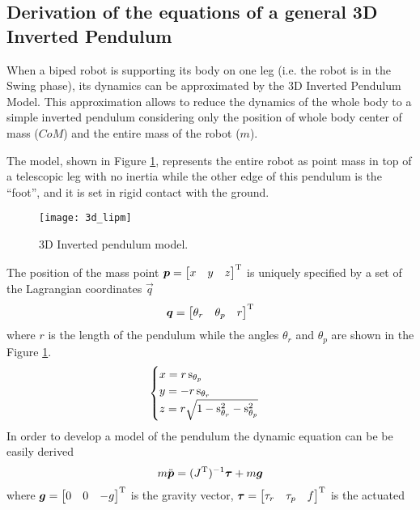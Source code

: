 \subsection{Derivation of the equations of a general 3D Inverted Pendulum}
When a biped robot is supporting its body on one leg (i.e. the robot is
in the Swing phase), its dynamics can be approximated by the 3D Inverted Pendulum Model. This
approximation allows to reduce the dynamics of the whole body to a simple inverted pendulum
considering only the position of whole body center of mass ($CoM$) and
the entire mass of the robot ($m$).
\par
The model, shown in Figure \ref{fig:3d_lipm}, represents the entire robot as point mass in
top of a telescopic leg with no inertia while the other edge of this pendulum is the
``foot'', and it is set in rigid contact with the ground.
\begin{figure}[!ht]
  \centering
  \texttt{[image: 3d\_lipm]}
  \caption{3D Inverted pendulum model. \label{fig:3d_lipm}}
\end{figure}
\par
The position of the mass point $\boldsymbol{p} = \begin{bmatrix} x & y & z \end{bmatrix} ^{\mathrm{T}}$
is uniquely specified by a set of the Lagrangian coordinates $\vec{q}$
\[
\boldsymbol{q} =
\begin{bmatrix}
  \theta_r & \theta_p & r
\end{bmatrix}^{\mathrm{T}}
\]
where $r$ is the length of the pendulum while
the angles $\theta_r$ and $\theta_p$ are shown in the Figure \ref{fig:3d_lipm}.
\[
\begin{cases}
  x = r \mathop{}\!\mathrm{s}_{\theta_p}\\
  y = -r \mathop{}\!\mathrm{s}_{\theta_r}\\
  z = r \sqrt{1-\mathop{}\!\mathrm{s}_{\theta_r}^2-\mathop{}\!\mathrm{s}_{\theta_p}^2}
\end{cases}
\]
In order to develop a model of the pendulum the dynamic equation can be be easily derived
\begin{equation}
  \label{eq:3d_ip_inverseJ}
  m \ddot{\boldsymbol{p}} = (J^{\mathrm{T}})^{-1} \boldsymbol{\tau}  + m \boldsymbol{g}
\end{equation}
where $\boldsymbol{g} = \begin{bmatrix} 0 & 0 & -g \end{bmatrix} ^{\mathrm{T}}$ is the gravity vector,
$\boldsymbol{\tau} = \begin{bmatrix} \tau_r & \tau_p & f \end{bmatrix} ^{\mathrm{T}}$ is the actuated
